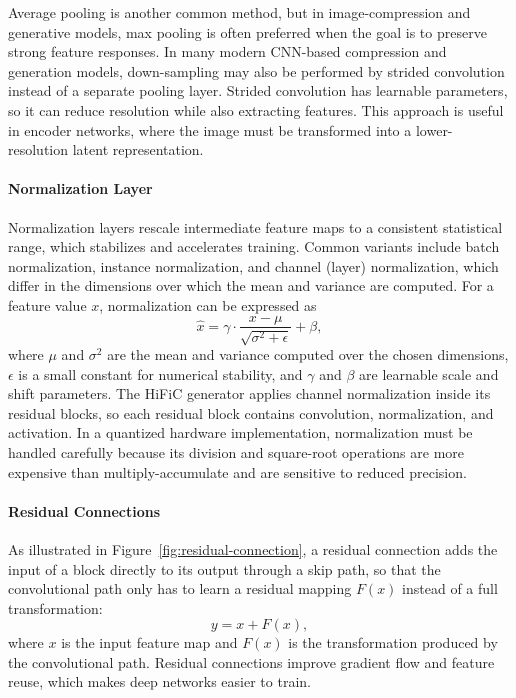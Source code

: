 Average pooling is another common method, but in image-compression and generative models, max pooling is often preferred when the goal is to preserve strong feature responses. In many modern CNN-based compression and generation models, down-sampling may also be performed by strided convolution instead of a separate pooling layer. Strided convolution has learnable parameters, so it can reduce resolution while also extracting features. This approach is useful in encoder networks, where the image must be transformed into a lower-resolution latent representation.

\paragraph{Normalization Layer}

Normalization layers rescale intermediate feature maps to a consistent statistical range, which stabilizes and accelerates training. Common variants include batch normalization, instance normalization, and channel (layer) normalization, which differ in the dimensions over which the mean and variance are computed. For a feature value $x$, normalization can be expressed as
\begin{equation}
\hat{x} = \gamma \cdot \frac{x - \mu}{\sqrt{\sigma^2 + \epsilon}} + \beta,
\end{equation}
where $\mu$ and $\sigma^2$ are the mean and variance computed over the chosen dimensions, $\epsilon$ is a small constant for numerical stability, and $\gamma$ and $\beta$ are learnable scale and shift parameters. The HiFiC generator applies channel normalization inside its residual blocks, so each residual block contains convolution, normalization, and activation. In a quantized hardware implementation, normalization must be handled carefully because its division and square-root operations are more expensive than multiply-accumulate and are sensitive to reduced precision.

\paragraph{Residual Connections}

As illustrated in Figure~\ref{fig:residual-connection}, a residual connection adds the input of a block directly to its output through a skip path, so that the convolutional path only has to learn a residual mapping $F(x)$ instead of a full transformation:
\begin{equation}
y = x + F(x),
\end{equation}
where $x$ is the input feature map and $F(x)$ is the transformation produced by the convolutional path. Residual connections improve gradient flow and feature reuse, which makes deep networks easier to train.

